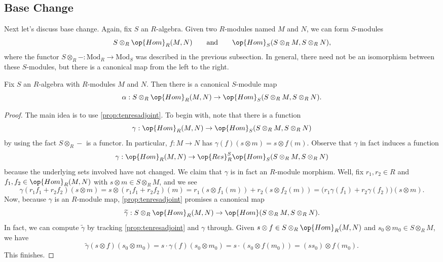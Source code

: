 \subsection{Base Change}
Next let's discuss base change. Again, fix $S$ an $R$-algebra. Given two $R$-modules named $M$ and $N$, we can form $S$-modules
\[S\otimes_R\op{Hom}_R(M,N)\qquad\text{and}\qquad\op{Hom}_S(S\otimes_RM,S\otimes_RN),\]
where the functor $S\otimes_R-:\textrm{Mod}_R\to\textrm{Mod}_S$ was described in the previous subsection. In general, there need not be an isomorphism between these $S$-modules, but there is a canonical map from the left to the right.
\begin{lemma} \label{lem:basechange}
	Fix $S$ an $R$-algebra with $R$-modules $M$ and $N$. Then there is a canonical $S$-module map
	\[\alpha:S\otimes_R\op{Hom}_R(M,N)\to\op{Hom}_S(S\otimes_RM,S\otimes_RN).\]
\end{lemma}
\begin{proof}
	The main idea is to use \autoref{prop:tenresadjoint}. To begin with, note that there is a function
	\[\gamma:\op{Hom}_R(M,N)\to\op{Hom}_S(S\otimes_RM,S\otimes_RN)\]
	by using the fact $S\otimes_R-$ is a functor. In particular, $f:M\to N$ has $\gamma(f)(s\otimes m)=s\otimes f(m)$. Observe that $\gamma$ in fact induces a function
	\[\gamma:\op{Hom}_R(M,N)\to\op{Res}^S_R\op{Hom}_S(S\otimes_RM,S\otimes_RN)\]
	because the underlying sets involved have not changed. We claim that $\gamma$ is in fact an $R$-module morphism. Well, fix $r_1,r_2\in R$ and $f_1,f_2\in\op{Hom}_R(M,N)$ with $s\otimes m\in S\otimes_RM$, and we see
	\[\gamma(r_1f_1+r_2f_2)(s\otimes m)=s\otimes(r_1f_1+r_2f_2)(m)=r_1(s\otimes f_1(m))+r_2(s\otimes f_2(m))=\big(r_1\gamma(f_1)+r_2\gamma(f_2)\big)(s\otimes m).\]
	Now, because $\gamma$ is an $R$-module map, \autoref{prop:tenresadjoint} promises a canonical map
	\[\widetilde\gamma:S\otimes_R\op{Hom}_R(M,N)\to\op{Hom}(S\otimes_RM,S\otimes_RN).\]
	In fact, we can compute $\widetilde\gamma$ by tracking \autoref{prop:tenresadjoint} and $\gamma$ through. Given $s\otimes f\in S\otimes_R\op{Hom}_R(M,N)$ and $s_0\otimes m_0\in S\otimes_RM$, we have
	\[\widetilde\gamma(s\otimes f)(s_0\otimes m_0)=s\cdot\gamma(f)(s_0\otimes m_0)=s\cdot(s_0\otimes f(m_0))=(ss_0)\otimes f(m_0).\]
	This finishes.
\end{proof}
